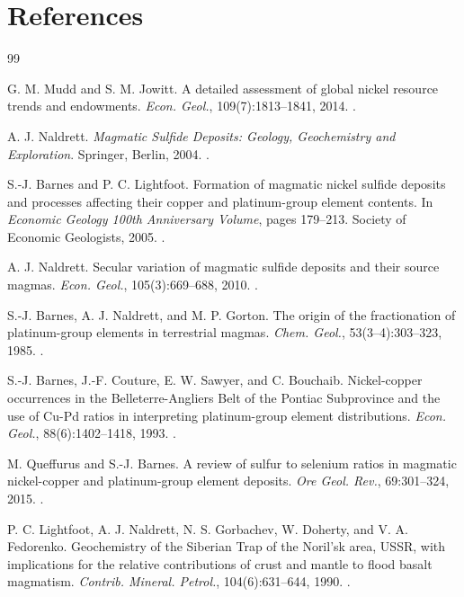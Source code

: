 \documentclass[10pt,twocolumn,letterpaper]{article}
\begin{document}
\section*{References}
\begingroup
\renewcommand{\section}[2]{}
\begin{thebibliography}{99}

 G. M. Mudd and S. M. Jowitt. A detailed assessment of global nickel resource trends and endowments. \textit{Econ. Geol.}, 109(7):1813--1841, 2014. .

 A. J. Naldrett. \textit{Magmatic Sulfide Deposits: Geology, Geochemistry and Exploration}. Springer, Berlin, 2004. .

 S.-J. Barnes and P. C. Lightfoot. Formation of magmatic nickel sulfide deposits and processes affecting their copper and platinum-group element contents. In \textit{Economic Geology 100th Anniversary Volume}, pages 179--213. Society of Economic Geologists, 2005. .

 A. J. Naldrett. Secular variation of magmatic sulfide deposits and their source magmas. \textit{Econ. Geol.}, 105(3):669--688, 2010. .

 S.-J. Barnes, A. J. Naldrett, and M. P. Gorton. The origin of the fractionation of platinum-group elements in terrestrial magmas. \textit{Chem. Geol.}, 53(3--4):303--323, 1985. .

 S.-J. Barnes, J.-F. Couture, E. W. Sawyer, and C. Bouchaib. Nickel-copper occurrences in the Belleterre-Angliers Belt of the Pontiac Subprovince and the use of Cu-Pd ratios in interpreting platinum-group element distributions. \textit{Econ. Geol.}, 88(6):1402--1418, 1993. .

 M. Queffurus and S.-J. Barnes. A review of sulfur to selenium ratios in magmatic nickel-copper and platinum-group element deposits. \textit{Ore Geol. Rev.}, 69:301--324, 2015. .

 P. C. Lightfoot, A. J. Naldrett, N. S. Gorbachev, W. Doherty, and V. A. Fedorenko. Geochemistry of the Siberian Trap of the Noril'sk area, USSR, with implications for the relative contributions of crust and mantle to flood basalt magmatism. \textit{Contrib. Mineral. Petrol.}, 104(6):631--644, 1990. .


\end{thebibliography}
\end{document}
